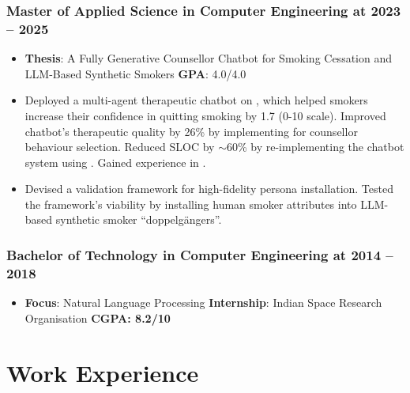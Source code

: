 \documentclass{ExpressiveResume}
\newcommand{\mainBullet}{\hspace{12pt}\color{blue}\fontsize{11}{13.2}\selectfont{\ding{70}}}
\begin{document}
\subsubsection*{\mainBullet Master of Applied Science in Computer Engineering at  \hfill 2023 -- 2025}
\begin{itemize}[leftmargin=*, label={}]
    \item \textbf{Thesis}: A Fully Generative Counsellor Chatbot for Smoking Cessation and LLM-Based Synthetic Smokers \hspace{1pt}\textbar\hspace{1pt} \textbf{GPA}: 4.0/4.0
    \item Deployed a multi-agent therapeutic chatbot \cite{mahmood2025fullygenerativemotivationalinterviewing} on , which helped smokers increase their confidence in quitting smoking by 1.7 (0-10 scale). Improved chatbot's therapeutic quality by 26\% by implementing  for counsellor behaviour selection. Reduced SLOC by $\sim$60\% by re-implementing the chatbot system using . Gained experience in .
    \item Devised a validation framework for high-fidelity persona installation. Tested the framework's viability by installing human smoker attributes into LLM-based  synthetic smoker ``doppelgängers''.
\end{itemize}

\subsubsection*{\mainBullet Bachelor of Technology in Computer Engineering at  \hfill 2014 -- 2018}
\begin{itemize}[leftmargin=*, label={}]
    \item \textbf{Focus}: Natural Language Processing \hspace{1pt}\textbar\hspace{1pt} \textbf{Internship}: Indian Space Research Organisation \hspace{1pt}\textbar\hspace{1pt} \textbf{CGPA: 8.2/10}
\end{itemize}

\section{Work Experience}
\end{document}
